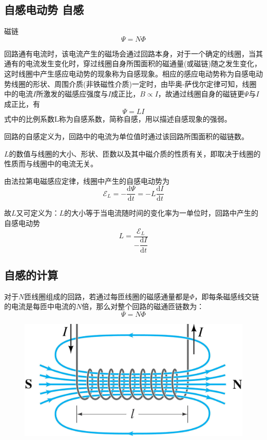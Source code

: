 \documentclass[12pt]{article}
\newcommand{\rmd}{\mathrm{d}}
\newcommand{\deriv}[2]{\frac{\rmd #1}{\rmd #2}}
\newcommand{\dderiv}[2]{\dfrac{\rmd #1}{\rmd #2}}
\begin{document}
\subsection{自感电动势 \quad 自感}

磁链
\begin{equation}
    \varPsi = N \varPhi
\end{equation}

回路通有电流时，该电流产生的磁场会通过回路本身，对于一个确定的线圈，当其通有的电流发生变化时，穿过线圈自身所围面积的磁通量(或磁链)随之发生变化，这时线圈中产生感应电动势的现象称为自感现象。相应的感应电动势称为自感电动势线圈的形状、周围介质(非铁磁性介质)一定时，由毕奥-萨伐尔定律可知，线圈中的电流\(I\)所激发的磁感应强度与\(I\)成正比，\(B \propto I\)，故通过线圈自身的磁链更\(\varPsi\)与\(I\)成正比，有
\begin{equation}
    \varPsi = L I
\end{equation}
式中的比例系数L称为自感系数，简称自感，用以描述自感现象的强弱。

回路的自感定义为，回路中的电流为单位值时通过该回路所围面积的磁链数。

\(L\)的数值与线圈的大小、形状、匝数以及其中磁介质的性质有关，即取决于线圈的性质而与线圈中的电流无关。

由法拉第电磁感应定律，线圈中产生的自感电动势为
\begin{equation}
    \mathscr{E}_L = -\deriv{\varPsi}{t} = - L \deriv{I}{t}
\end{equation}

故\(L\)又可定义为：\(L\)的大小等于当电流随时间的变化率为一单位时，回路中产生的自感电动势
\begin{equation}
    L = \frac{\mathscr{E}_L}{-\dderiv{I}{t}}
\end{equation}

\subsection{自感的计算}

对于\(N\)匝线圈组成的回路，若通过每匝线圈的磁感通量都是\(\varPhi\)，即每条磁感线交链的电流是每匝中电流的\(N\)倍，那么对整个回路的磁通匝链数为：
\begin{equation}
    \varPsi = N \varPhi
\end{equation}

\begin{figure}[!h]
    \centering
    \includegraphics[width = .3\textwidth]{graphics/自感系数的计算.png}
\end{figure}
\end{document}
